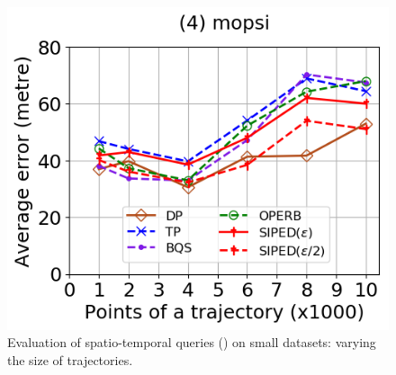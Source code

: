 \begin{figure}[tb!]
	\includegraphics[scale=0.320]{Figures/Exp-query-PED-error-size-mopsi.png}		
	\vspace{-2ex}
	\caption{\small Evaluation of spatio-temporal queries (\ped) on small datasets: varying the size of
		trajectories.}
	\label{fig:query-ped-size}
	\vspace{-2ex}
\end{figure}

